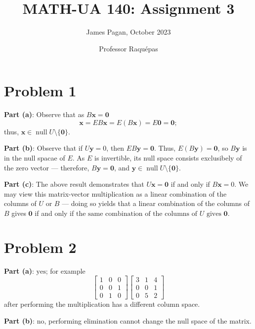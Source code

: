 \documentclass[11pt]{article}
\title{MATH-UA 140: Assignment 3}
\author{James Pagan, October 2023}
\date{Professor Raquépas}
\renewcommand{\vec}[1]{\mathbf{#1}}
\begin{document}
\maketitle
\tableofcontents


\section{Problem 1}

\textbf{Part (a)}: Observe that as $B \vec{x} = \vec{0}$
\[
	\vec{x} = EB \vec{x} = E (B \vec{x}) = E \vec{0} = \vec{0};
\]
thus, $\boxed{\vec{x} \in \operatorname{null} U \setminus \{ \vec{0} \}}$.

\textbf{Part (b)}: Observe that if $U \vec{y} = 0$, then $EB \vec{y} = \vec{0}$. Thus, $E (B \vec{y}) = \vec{0}$, so $B \vec{y}$ is in the null spacae of $E$. As $E$ is invertible, its null space consists exclusibely of the zero vector --- therefore, $B \vec{y} = \vec{0}$, and $\boxed{\vec{y} \in \operatorname{null} U \setminus \{ \vec{0} \}}$.


\textbf{Part (c)}: The above result demonstrates that $U \vec{x} = \vec{0}$ if and only if $B \vec{x} = 0$. We may view this matrix-vector multiplication as a linear combination of the columns of $U$ or $B$ --- doing so yields that a linear combination of the columns of $B$ gives $\vec{0}$ if and only if $\boxed{\text{the same combination of the columns of $U$ gives $\vec{0}$}}$.


\section{Problem 2}

\textbf{Part (a)}: $\boxed{\text{yes}}$; for example
\[
	\begin{bmatrix} 1 & 0 & 0 \\ 0 & 0 & 1 \\ 0 & 1 & 0 \end{bmatrix} \begin{bmatrix} 3 & 1 & 4 \\ 0 & 0 & 1 \\ 0 & 5 & 2 \end{bmatrix}
\]
after performing the multiplication has a different column space.

\textbf{Part (b)}: $\boxed{\text{no}}$, performing elimination cannot change the null space of the matrix.
\end{document}
